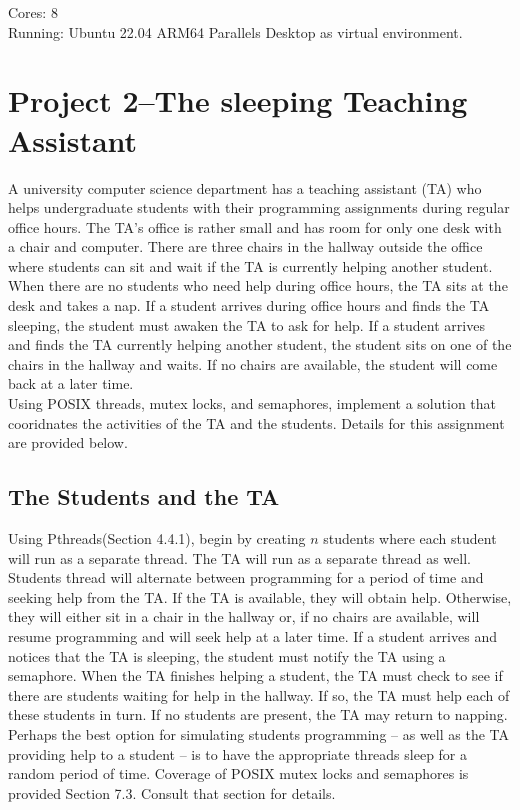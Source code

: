 \documentclass[12pt]{article}
\begin{document}
    Cores: 8\\
    
    Running: Ubuntu 22.04 ARM64 Parallels Desktop as virtual environment.\\
    
    \newpage
    \section*{Project 2--The sleeping Teaching Assistant}
    
    A university computer science department has a teaching assistant (TA) who helps undergraduate students with their programming assignments during regular office hours. The TA's office is rather small and has room for only one desk with a chair and computer. There are three chairs in the hallway outside the office where students can sit and wait if the TA is currently helping another student. When there are no students who need help during office hours, the TA sits at the desk and takes a nap. If a student arrives during office hours and finds the TA sleeping, the student must awaken the TA to ask for help. If a student arrives and finds the TA currently helping another student, the student sits on one of the chairs in the hallway and waits. If no chairs are available, the student will come back at a later time.\\
    Using POSIX threads, mutex locks, and semaphores, implement a solution that cooridnates the activities of the TA and the students. Details for this assignment are provided below.
    \subsection*{The Students and the TA}
    Using Pthreads(Section 4.4.1), begin by creating $n$ students where each student will run as a separate thread. The TA will run as a separate thread as well. Students thread will alternate between programming for a period of time and seeking help from the TA. If the TA is available, they will obtain help. Otherwise, they will either sit in a chair in the hallway or, if no chairs are available, will resume programming and will seek help at a later time. If a student arrives and notices that the TA is sleeping, the student must notify the TA using a semaphore. When the TA finishes helping a student, the TA must check to see if there are students waiting for help in the hallway. If so, the TA must help each of these students in turn. If no students are present, the TA may return to napping.\\
    Perhaps the best option for simulating students programming -- as well as the TA providing help to a student -- is to have the appropriate threads sleep for a random period of time.
    Coverage of POSIX mutex locks and semaphores is provided Section 7.3. Consult that section for details.
\end{document}
